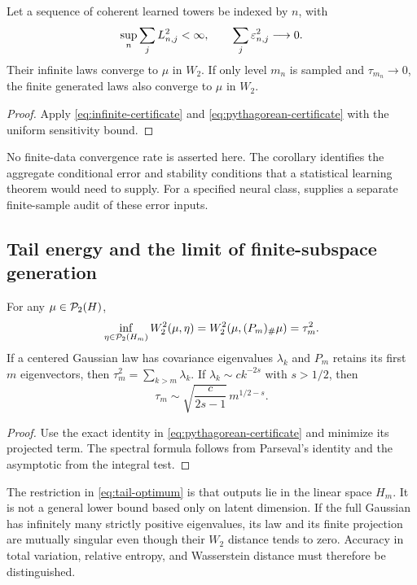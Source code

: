 
\FloatBarrier

\begin{corollary}\label{cor:learning-consistency}
Let a sequence of coherent learned towers be indexed by $n$, with
\[
 \sup_n\sum_jL_{n,j}^2<\infty,\qquad \sum_j\varepsilon_{n,j}^2\longrightarrow0.
\]
Their infinite laws converge to $\mu$ in $W_2$. If only level $m_n$ is sampled and $\tau_{m_n}\to0$, the finite generated laws also converge to $\mu$ in $W_2$.
\end{corollary}
\begin{proof}
Apply \eqref{eq:infinite-certificate} and \eqref{eq:pythagorean-certificate} with the uniform sensitivity bound.
\end{proof}

No finite-data convergence rate is asserted here. The corollary identifies the aggregate conditional error and stability conditions that a statistical learning theorem would need to supply. For a specified neural class,  supplies a separate finite-sample audit of these error inputs.

\subsection{Tail energy and the limit of finite-subspace generation}
\begin{corollary}\label{cor:tail}
For any $\mu\in\mathcal P_2(H)$,
\begin{equation}\label{eq:tail-optimum}
 \inf_{\eta\in\mathcal P_2(H_m)}W_2^2(\mu,\eta)
 =W_2^2(\mu,(P_m)_{\#}\mu)=\tau_m^2.
\end{equation}
If a centered Gaussian law has covariance eigenvalues $\lambda_k$ and $P_m$ retains its first $m$ eigenvectors, then $\tau_m^2=\sum_{k>m}\lambda_k$. If $\lambda_k\sim c k^{-2s}$ with $s>1/2$, then
\begin{equation}
 \tau_m\sim\sqrt{\frac{c}{2s-1}}\,m^{1/2-s}.
\end{equation}
\end{corollary}
\begin{proof}
Use the exact identity in \eqref{eq:pythagorean-certificate} and minimize its projected term. The spectral formula follows from Parseval's identity and the asymptotic from the integral test.
\end{proof}
The restriction in \eqref{eq:tail-optimum} is that outputs lie in the linear space $H_m$. It is not a general lower bound based only on latent dimension. If the full Gaussian has infinitely many strictly positive eigenvalues, its law and its finite projection are mutually singular even though their $W_2$ distance tends to zero. Accuracy in total variation, relative entropy, and Wasserstein distance must therefore be distinguished.

